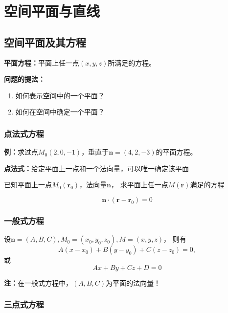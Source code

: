 \section{空间平面与直线}

\subsection{空间平面及其方程}

{\bf 平面方程：}平面上任一点$(x,y,z)$所满足的方程。

{\bf 问题的提法：}
\begin{enumerate}[(1)]
  \setlength{\itemindent}{1cm}
  \item 如何表示空间中的一个平面？
  \item 如何在空间中确定一个平面？
\end{enumerate}


\subsubsection{点法式方程}

{\bf 例：}求过点$M_0(2,0,-1)$，垂直于$\bm{n}=(4,2,-3)$的平面方程。

{\bf 点法式：}给定平面上一点和一个法向量，可以唯一确定该平面

已知平面上一点$M_0(\bm{r}_0)$，法向量$\bm{n}$，
求平面上任一点$M(\bm{r})$满足的方程 
	
$$\bm{n}\cdot(\bm{r}-\bm{r}_0)=0$$ 

\subsubsection{一般式方程}

设$\bm{n}=(A,B,C),M_0=(x_0,y_0,z_0),M=(x,y,z)$， 则有
$$A(x-x_0)+B(y-y_0)+C(z-z_0)=0,$$
或 
$$Ax+By+Cz+D=0$$ 

{\bf 注：}在一般式方程中，$(A,B,C)$为平面的法向量！

\subsubsection{三点式方程}

